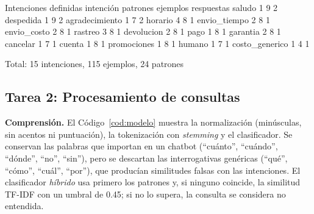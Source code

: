 \documentclass[11pt,letterpaper]{article}
\begin{document}
\begin{consola}[label=out:intenciones]{Intenciones definidas}
     intención  patrones  ejemplos  respuestas
        saludo         1         9           2
     despedida         1         9           2
agradecimiento         1         7           2
       horario         4         8           1
  envio_tiempo         2         8           1
   envio_costo         2         8           1
       rastreo         3         8           1
    devolucion         2         8           1
          pago         1         8           1
      garantia         2         8           1
      cancelar         1         7           1
        cuenta         1         8           1
   promociones         1         8           1
        humano         1         7           1
costo_generico         1         4           1

Total: 15 intenciones, 115 ejemplos, 24 patrones
\end{consola}

\subsection{Tarea 2: Procesamiento de consultas}

\textbf{Comprensión.} El Código~\ref{cod:modelo} muestra la normalización (minúsculas, sin acentos ni puntuación), la tokenización con \textit{stemming} y el clasificador. Se conservan las palabras que importan en un chatbot (``cuánto'', ``cuándo'', ``dónde'', ``no'', ``sin''), pero se descartan las interrogativas genéricas (``qué'', ``cómo'', ``cuál'', ``por''), que producían similitudes falsas con las intenciones. El clasificador \emph{híbrido} usa primero los patrones y, si ninguno coincide, la similitud TF-IDF con un umbral de 0.45; si no lo supera, la consulta se considera no entendida.
\end{document}
